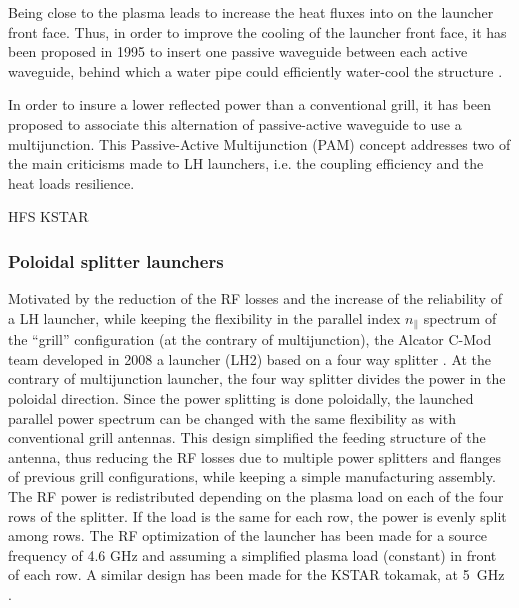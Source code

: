 Being close to the plasma leads to increase the heat fluxes into on the launcher front face. Thus, in order to improve the cooling of the launcher front face, it has been proposed in 1995 to insert one passive waveguide between each active waveguide, behind which a water pipe could efficiently water-cool the structure . 

In order to insure a lower reflected power than a conventional grill, it has been proposed to associate this alternation of passive-active waveguide to  use a multijunction. This Passive-Active Multijunction (PAM) concept addresses two of the main criticisms made to LH launchers, i.e. the coupling efficiency and the heat loads resilience. 



HFS KSTAR


%
%
%

\subsubsection{Poloidal splitter launchers}
Motivated by the reduction of the RF losses and the increase of the reliability of a LH launcher, while keeping the flexibility in the parallel index $n_{\parallel}$ spectrum of the “grill” configuration (at the contrary of multijunction), the Alcator C-Mod team developed in 2008 a launcher (LH2) based on a four way splitter . At the contrary of multijunction launcher, the four way splitter divides the power in the poloidal direction. Since the power splitting is done poloidally, the launched parallel power spectrum can be changed with the same flexibility as with conventional grill antennas. This design simplified the feeding structure of the antenna, thus reducing the RF losses due to multiple power splitters and flanges of previous grill configurations, while keeping a simple manufacturing assembly. The RF power is redistributed depending on the plasma load on each of the four rows of the splitter. If the load is the same for each row, the power is evenly split among rows. The RF optimization of the launcher has been made for a source frequency of 4.6 GHz and assuming a simplified plasma load (constant) in front of each row. A similar design has been made for the KSTAR tokamak, at 5~GHz . 


